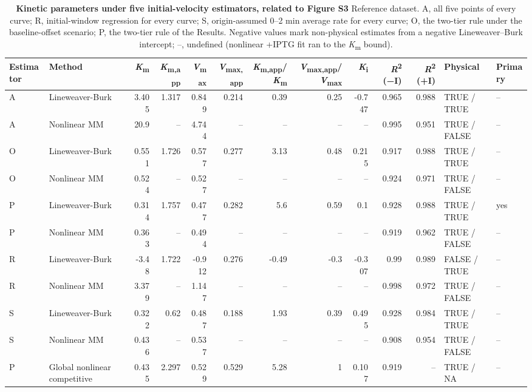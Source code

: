 \documentclass[9pt,twocolumn]{extarticle}
\newcommand{\Km}{\textit{K}\textsubscript{m}}
\newcommand{\Kmapp}{\textit{K}\textsubscript{m,app}}
\newcommand{\Vmax}{\textit{V}\textsubscript{max}}
\newcommand{\Vmaxapp}{\textit{V}\textsubscript{max,app}}
\newcommand{\Ki}{\textit{K}\textsubscript{i}}
\newcommand{\Rsq}{\textit{R}\textsuperscript{2}}
\newcommand{\dash}{–}
\begin{document}
\begin{table}[h]
\caption{\textbf{Kinetic parameters under five initial-velocity estimators, related to Figure S3}\newline
Reference dataset. A, all five points of every curve; R, initial-window regression for every curve; S, origin-assumed 0\dash 2 min average rate for every curve; O, the two-tier rule under the baseline-offset scenario; P, the two-tier rule of the Results. Negative values mark non-physical estimates from a negative Lineweaver\dash Burk intercept; –, undefined (nonlinear +IPTG fit ran to the \Km{} bound).}
\scriptsize
\begin{tabular}{@{}llrrrrrrrrrll@{}}
\toprule
Estimator & Method & \Km & \Kmapp & \Vmax & \Vmaxapp & \Kmapp/\Km & \Vmaxapp/\Vmax & \Ki & \Rsq{} (−I) & \Rsq{} (+I) & Physical & Primary \\
\midrule
A & Lineweaver-Burk & 3.405 & 1.317 & 0.849 & 0.214 & 0.39 & 0.25 & -0.747 & 0.965 & 0.988 & TRUE / TRUE & – \\
A & Nonlinear MM & 20.9 & – & 4.744 & – & – & – & – & 0.995 & 0.951 & TRUE / FALSE & – \\
O & Lineweaver-Burk & 0.551 & 1.726 & 0.577 & 0.277 & 3.13 & 0.48 & 0.215 & 0.917 & 0.988 & TRUE / TRUE & – \\
O & Nonlinear MM & 0.524 & – & 0.527 & – & – & – & – & 0.924 & 0.971 & TRUE / FALSE & – \\
P & Lineweaver-Burk & 0.314 & 1.757 & 0.477 & 0.282 & 5.6 & 0.59 & 0.1 & 0.928 & 0.988 & TRUE / TRUE & yes \\
P & Nonlinear MM & 0.363 & – & 0.494 & – & – & – & – & 0.919 & 0.962 & TRUE / FALSE & – \\
R & Lineweaver-Burk & -3.48 & 1.722 & -0.912 & 0.276 & -0.49 & -0.3 & -0.307 & 0.99 & 0.989 & FALSE / TRUE & – \\
R & Nonlinear MM & 3.379 & – & 1.147 & – & – & – & – & 0.998 & 0.972 & TRUE / FALSE & – \\
S & Lineweaver-Burk & 0.322 & 0.62 & 0.487 & 0.188 & 1.93 & 0.39 & 0.495 & 0.928 & 0.984 & TRUE / TRUE & – \\
S & Nonlinear MM & 0.436 & – & 0.537 & – & – & – & – & 0.908 & 0.954 & TRUE / FALSE & – \\
P & Global nonlinear competitive & 0.435 & 2.297 & 0.529 & 0.529 & 5.28 & 1 & 0.107 & 0.919 & – & TRUE / NA & – \\
\bottomrule
\end{tabular}
\end{table}
\end{document}
